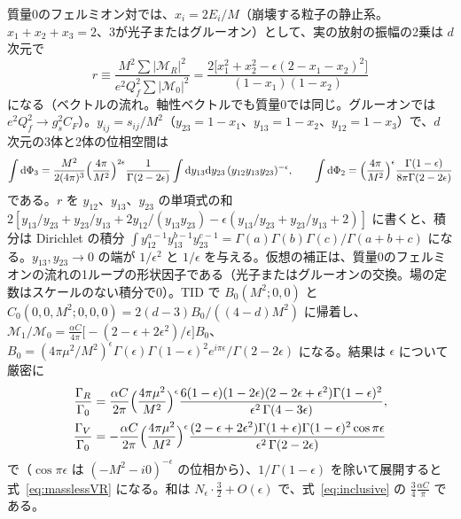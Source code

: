 \documentclass[a4paper,10pt]{ltjsarticle}
\newcommand{\dd}{\mathrm{d}}
\begin{document}
質量0のフェルミオン対では、$x_i=2E_i/M$（崩壊する粒子の静止系。$x_1+x_2+x_3=2$、3が光子またはグルーオン）として、実の放射の振幅の2乗は $d$ 次元で
\begin{equation*}
r\equiv\frac{M^2\sum|\mathcal M_R|^2}{e^2Q_f^2\sum|\mathcal M_0|^2}=\frac{2\bigl[x_1^2+x_2^2-\epsilon(2-x_1-x_2)^2\bigr]}{(1-x_1)(1-x_2)}
\end{equation*}
になる（ベクトルの流れ。軸性ベクトルでも質量0では同じ。グルーオンでは $e^2Q_f^2\to g_s^2C_F$）。$y_{ij}=s_{ij}/M^2$（$y_{23}=1-x_1$、$y_{13}=1-x_2$、$y_{12}=1-x_3$）で、$d$ 次元の3体と2体の位相空間は
\begin{equation*}
\int\dd\Phi_3=\frac{M^2}{2(4\pi)^3}\Bigl(\frac{4\pi}{M^2}\Bigr)^{2\epsilon}\frac1{\Gamma(2-2\epsilon)}\int\dd y_{13}\dd y_{23}\,(y_{12}y_{13}y_{23})^{-\epsilon},\qquad
\int\dd\Phi_2=\Bigl(\frac{4\pi}{M^2}\Bigr)^\epsilon\frac{\Gamma(1-\epsilon)}{8\pi\Gamma(2-2\epsilon)}
\end{equation*}
である。$r$ を $y_{12}$、$y_{13}$、$y_{23}$ の単項式の和 $2[y_{13}/y_{23}+y_{23}/y_{13}+2y_{12}/(y_{13}y_{23})-\epsilon(y_{13}/y_{23}+y_{23}/y_{13}+2)]$ に書くと、積分は Dirichlet の積分 $\int y_{12}^{a-1}y_{13}^{b-1}y_{23}^{c-1}=\Gamma(a)\Gamma(b)\Gamma(c)/\Gamma(a+b+c)$ になる。$y_{13},y_{23}\to0$ の端が $1/\epsilon^2$ と $1/\epsilon$ を与える。仮想の補正は、質量0のフェルミオンの流れの1ループの形状因子である（光子またはグルーオンの交換。場の定数はスケールのない積分で0）。TID で $B_0(M^2;0,0)$ と $C_0(0,0,M^2;0,0,0)=2(d-3)B_0/((4-d)M^2)$ に帰着し、$\mathcal M_1/\mathcal M_0=\frac{\alpha C}{4\pi}\bigl[-(2-\epsilon+2\epsilon^2)/\epsilon\bigr]B_0$、$B_0=(4\pi\mu^2/M^2)^\epsilon\Gamma(\epsilon)\Gamma(1-\epsilon)^2e^{i\pi\epsilon}/\Gamma(2-2\epsilon)$ になる。結果は $\epsilon$ について厳密に
\begin{equation}
\begin{aligned}
\frac{\Gamma_R}{\Gamma_0}&=\frac{\alpha C}{2\pi}\Bigl(\frac{4\pi\mu^2}{M^2}\Bigr)^\epsilon\frac{6(1-\epsilon)(1-2\epsilon)(2-2\epsilon+\epsilon^2)\Gamma(1-\epsilon)^2}{\epsilon^2\,\Gamma(4-3\epsilon)},\\
\frac{\Gamma_V}{\Gamma_0}&=-\frac{\alpha C}{2\pi}\Bigl(\frac{4\pi\mu^2}{M^2}\Bigr)^\epsilon\frac{(2-\epsilon+2\epsilon^2)\Gamma(1+\epsilon)\Gamma(1-\epsilon)^2\cos\pi\epsilon}{\epsilon^2\,\Gamma(2-2\epsilon)}
\end{aligned}
\label{eq:irexact}
\end{equation}
で（$\cos\pi\epsilon$ は $(-M^2-i0)^{-\epsilon}$ の位相から）、$1/\Gamma(1-\epsilon)$ を除いて展開すると式~\eqref{eq:masslessVR} になる。和は $N_\epsilon\cdot\frac32+O(\epsilon)$ で、式~\eqref{eq:inclusive} の $\frac34\frac{\alpha C}\pi$ である。
\end{document}
